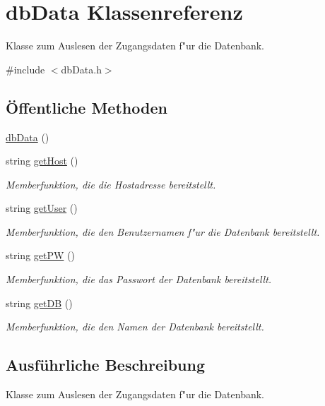 \hypertarget{classdbData}{\section{db\-Data Klassenreferenz}
\label{classdbData}
}


Klasse zum Auslesen der Zugangsdaten f"ur die Datenbank.  




{\ttfamily \#include $<$db\-Data.\-h$>$}

\subsection*{Öffentliche Methoden}
\begin{DoxyCompactItemize}
\item 
\hyperlink{classdbData_a956b366e8ba336b1ce92b7e199297990}{db\-Data} ()
\item 
string \hyperlink{classdbData_ace04e0d01cf38795aedd7e45ec55a770}{get\-Host} ()
\begin{DoxyCompactList}\small\item\em Memberfunktion, die die Hostadresse bereitstellt. \end{DoxyCompactList}\item 
string \hyperlink{classdbData_ad86749e31e3b786266fb3d10bb8c0b14}{get\-User} ()
\begin{DoxyCompactList}\small\item\em Memberfunktion, die den Benutzernamen f"ur die Datenbank bereitstellt. \end{DoxyCompactList}\item 
string \hyperlink{classdbData_ad27f68087763a858073688098717a0c2}{get\-P\-W} ()
\begin{DoxyCompactList}\small\item\em Memberfunktion, die das Passwort der Datenbank bereitstellt. \end{DoxyCompactList}\item 
string \hyperlink{classdbData_acbdfb09ee706014a5570638e0301ae85}{get\-D\-B} ()
\begin{DoxyCompactList}\small\item\em Memberfunktion, die den Namen der Datenbank bereitstellt. \end{DoxyCompactList}\end{DoxyCompactItemize}


\subsection{Ausführliche Beschreibung}
Klasse zum Auslesen der Zugangsdaten f"ur die Datenbank. 

